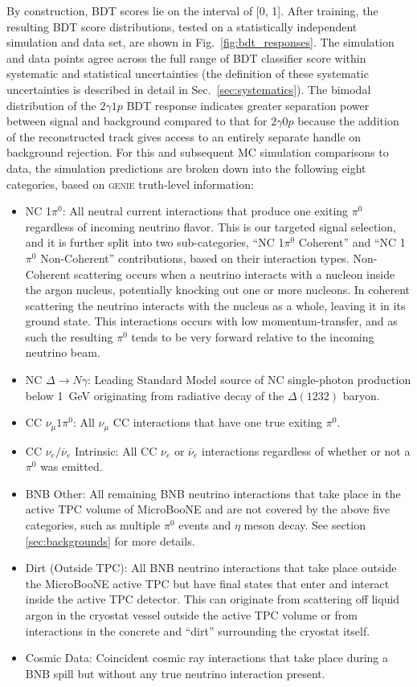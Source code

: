 By construction, BDT scores lie on the interval of [0, 1]. After training, the resulting BDT score distributions, tested on a statistically independent simulation and data set, are shown in Fig.~\ref{fig:bdt_responses}. The simulation and data points agree across the full range of BDT classifier score within systematic and statistical uncertainties (the definition of these systematic uncertainties is described in detail in Sec.~\ref{sec:systematics}). The bimodal distribution of the $2\gamma1p$ BDT response indicates greater separation power between signal and background compared to that for $2\gamma0p$ because the addition of the reconstructed track gives access to an entirely separate handle on background rejection. For this and subsequent MC simulation comparisons to data, the simulation predictions are broken down into the following eight categories, based on \textsc{genie} truth-level information:
\begin{itemize}
    \item NC 1$\pi^0$: All neutral current interactions that produce one exiting $\pi^0$ regardless of incoming neutrino flavor. This is our targeted signal selection, and it is further split into two sub-categories, ``NC 1$\pi^0$ Coherent'' and ``NC 1$\pi^0$ Non-Coherent'' contributions, based on their interaction types. Non-Coherent scattering occurs when a neutrino interacts with a nucleon inside the argon nucleus, potentially knocking out one or more nucleons. In coherent scattering the neutrino interacts with the nucleus as a whole, leaving it in its ground state. This interactions occurs with low momentum-transfer, and as such the resulting $\pi^0$ tends to be very forward relative to the incoming neutrino beam.
    \item NC $\Delta \rightarrow N\gamma$: Leading Standard Model source of NC single-photon production below 1~GeV originating from radiative decay of the $\Delta(1232)$ baryon.
    \item CC $\nu_\mu 1 \pi^0$: All $\nu_\mu$ CC interactions that have one true exiting $\pi^0$.
    \item CC $\nu_e/\overline{\nu}_{e}$ Intrinsic: All CC $\nu_e$ or $\overline{\nu}_{e}$ interactions regardless of whether or not a $\pi^0$ was emitted. 
    \item BNB Other: All remaining BNB neutrino interactions that take place in the active TPC volume of MicroBooNE and are not covered by the above five categories, such as multiple $\pi^0$ events and $\eta$ meson decay. See section \ref{sec:backgrounds} for more details.
    \item Dirt (Outside TPC): All BNB neutrino interactions that take place outside the MicroBooNE active TPC but have final states that enter and interact inside the active TPC detector. This can originate from scattering off liquid argon in the cryostat vessel outside the active TPC volume or from interactions in the concrete and ``dirt'' surrounding the cryostat itself. 
    \item Cosmic Data: Coincident cosmic ray interactions that take place during a BNB spill but without any true neutrino interaction present.
\end{itemize}

